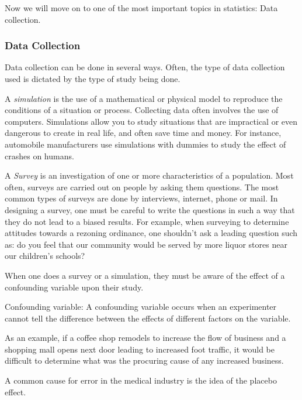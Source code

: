 Now we will move on to one of the most important topics in statistics: Data collection.

\subsubsection{Data Collection}

Data collection can be done in several ways. Often, the type of data collection used is dictated by the type of study being done.\newline

A \emph{simulation} is the use of a mathematical or physical model to reproduce the conditions of a situation or process. Collecting data often involves the use of computers. Simulations allow you to study situations that are impractical or even dangerous to create in real life, and often save time and money. For instance, automobile manufacturers use simulations with dummies to study the effect of crashes on humans.\newline

A \emph{Survey} is an investigation of one or more characteristics of a population. Most often, surveys are carried out on people by asking them questions. The most common types of surveys are done by interviews, internet, phone or mail. In designing a survey, one must be careful to write the questions in such a way that they do not lead to a biased results. For example, when surveying to determine attitudes towards a rezoning ordinance, one shouldn't ask  a leading question such as: do you feel that our community would be served by more liquor stores near our children's schools?\newline

When one does a survey or a simulation, they must be aware of the effect of a confounding variable upon their study.

\begin{definition}
Confounding variable: A confounding variable occurs when an experimenter cannot tell the difference between the effects of different factors on the variable.
\end{definition} 

As an example, if a coffee shop remodels to increase the flow of business and a shopping mall opens next door leading to increased foot traffic, it would be difficult to determine what was the procuring cause of any increased business.\newline

A common cause for error in the medical industry is the idea of the placebo effect.

